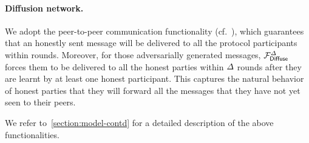 \paragraph{Diffusion network.}
%
We adopt the peer-to-peer communication functionality \funcDiffuse (cf.~\cite{EC:BGKRZ21}), which guarantees that an honestly sent message will be delivered to all the protocol participants within \delay rounds.
%
Moreover, for those adversarially generated messages, $\mathcal{F}_{\mathsf{Diffuse}}^\varDelta$ forces them to be delivered to all the honest parties within $\varDelta$ rounds after they are learnt by at least one honest participant.
%
This captures the natural behavior of honest parties that they will forward all the messages that they have not yet seen to their peers.

\medskip
%
We refer to~\cref{section:model-contd} for a detailed description of the above functionalities.
